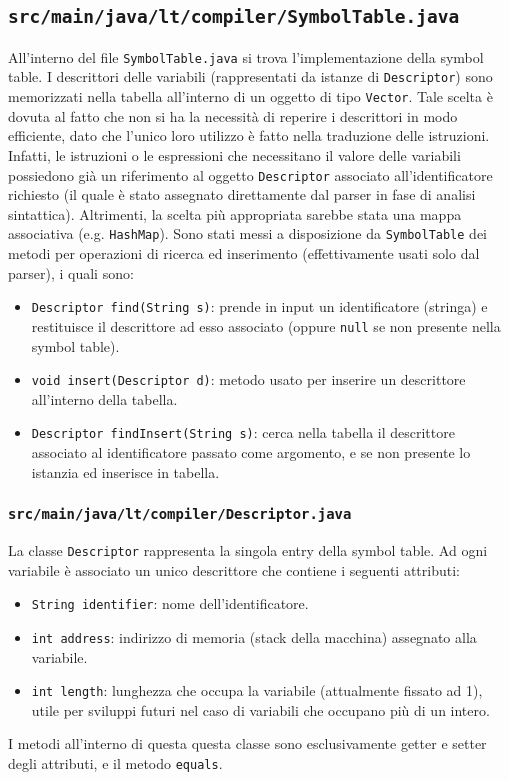 \documentclass[hidelinks,10pt,a4paper]{article}
\begin{document}
\subsection{\texttt{src/main/java/lt/compiler/SymbolTable.java}}
All'interno del file \texttt{SymbolTable.java} si trova l'implementazione della symbol table.
I descrittori delle variabili (rappresentati da istanze di \texttt{Descriptor}) sono memorizzati nella tabella all'interno di un oggetto di tipo \texttt{Vector}.
Tale scelta è dovuta al fatto che non si ha la necessità di reperire i descrittori in modo efficiente, dato che l'unico loro utilizzo è fatto nella traduzione delle istruzioni.
Infatti, le istruzioni o le espressioni che necessitano il valore delle variabili possiedono già un riferimento al oggetto \texttt{Descriptor} associato all'identificatore richiesto (il quale è stato assegnato direttamente dal parser in fase di analisi sintattica).
Altrimenti, la scelta più appropriata sarebbe stata una mappa associativa (e.g. \texttt{HashMap}).
Sono stati messi a disposizione da \texttt{SymbolTable} dei metodi per operazioni di ricerca ed inserimento (effettivamente usati solo dal parser), i quali sono:
\begin{itemize}
    \item \texttt{Descriptor find(String s)}: prende in input un identificatore (stringa) e restituisce il descrittore ad esso associato (oppure \texttt{null} se non presente nella symbol table).
    \item \texttt{void insert(Descriptor d)}: metodo usato per inserire un descrittore all'interno della tabella.
    \item \texttt{Descriptor findInsert(String s)}: cerca nella tabella il descrittore associato al identificatore passato come argomento, e se non presente lo istanzia ed inserisce in tabella.
\end{itemize}

\subsubsection{\texttt{src/main/java/lt/compiler/Descriptor.java}}
La classe \texttt{Descriptor} rappresenta la singola entry della symbol table.
Ad ogni variabile è associato un unico descrittore che contiene i seguenti attributi:
\begin{itemize}
    \item \texttt{String identifier}: nome dell'identificatore.
    \item \texttt{int address}: indirizzo di memoria (stack della macchina) assegnato alla variabile.
    \item \texttt{int length}: lunghezza che occupa la variabile (attualmente fissato ad 1), utile per sviluppi futuri nel caso di variabili che occupano più di un intero.
\end{itemize}
I metodi all'interno di questa questa classe sono esclusivamente getter e setter degli attributi, e il metodo \texttt{equals}.
\end{document}
